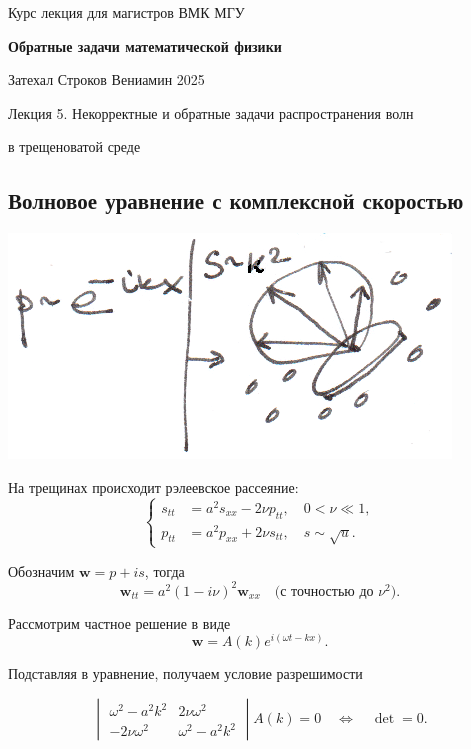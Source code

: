 \documentclass{article}
\begin{document}
\centerline{\large Курс лекция для магистров ВМК МГУ}
\centerline {\textbf{\LARGE Обратные задачи математической физики}}
\centerline {Затехал Строков Вениамин 2025}

\vspace{0.4cm}

\centerline{\LARGE 	Лекция 5. Некорректные и обратные задачи распространения волн}
\centerline{\LARGE 	в трещеноватой среде}

\vspace{0.5cm}

\subsection*{Волновое уравнение с комплексной скоростью}


\vspace{0.2cm}
\includegraphics[scale=0.75]{pic5_1.png}
\vspace{0.2cm}


На трещинах происходит рэлеевское рассеяние:
$$\begin{cases}
    s_{tt} &= a^2 s_{xx} - 2 \nu p_{tt}, \quad 0 < \nu \ll 1, \\
    p_{tt} &= a^2 p_{xx} + 2 \nu s_{tt}, \quad s \sim \sqrt{
u}.
\end{cases}$$

Обозначим $\mathbf{w} = p + i s$, тогда
\begin{equation*}
    \mathbf{w}_{tt} = a^2 (1 - i \nu)^2 \mathbf{w}_{xx} \quad \text{(с точностью до } \nu^2 \text{)}.
\end{equation*}

Рассмотрим частное решение в виде
\begin{equation*}
    \mathbf{w} = A(k) e^{i(\omega t - kx)}.
\end{equation*}

Подставляя в уравнение, получаем условие разрешимости

\begin{equation*}
    \begin{vmatrix}
        \omega^2 - a^2 k^2 & 2\nu \omega^2 \\
        -2 \nu \omega^2 & \omega^2 - a^2 k^2
    \end{vmatrix}
    A(k) = 0 \quad \Leftrightarrow \quad \det = 0.
\end{equation*}
\end{document}
